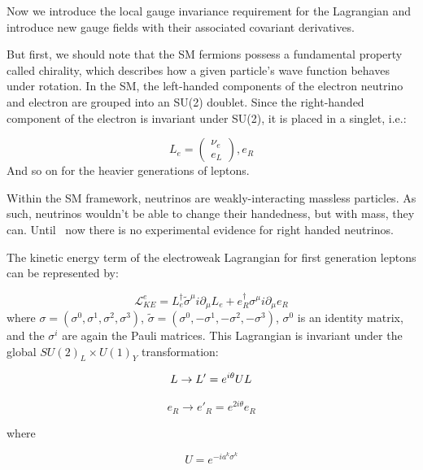 Now we introduce the local gauge invariance requirement for the Lagrangian and introduce new gauge fields with their associated covariant derivatives.

But first, we should note that the SM fermions possess a fundamental property called chirality, which describes how a given particle's wave function behaves under rotation. In the SM, the left-handed components of the electron neutrino and electron are grouped into an SU(2) doublet. Since the right-handed component of the electron is invariant under SU(2), it is placed in a singlet, i.e.:

\begin{equation}
L_{e} = \begin{pmatrix}
	\nu_{e} \\
	e_{L}
\end{pmatrix}
, e_{R}
\end{equation}
 And so on for the heavier generations of leptons. 

Within the SM framework, neutrinos are weakly-interacting massless particles. As such, neutrinos wouldn't be able to change their handedness, but with mass, they can. Until \
now there is no experimental evidence for right handed neutrinos.

 The kinetic energy term of the electroweak Lagrangian for first generation leptons can be represented by:

 \begin{equation}
 \mathcal{L}_{KE}^{e} = L_{e}^{\dagger}\tilde{\sigma}^{\mu}i\partial_{\mu}L_{e}+ e_{R}^{\dagger}\sigma^{\mu}i\partial_{\mu}e_{R}
 \end{equation}
where $\sigma = (\sigma^{0}, \sigma^{1},\sigma^{2}, \sigma^{3})$, $\tilde{\sigma} = (\sigma^{0}, -\sigma^{1},-\sigma^{2}, -\sigma^{3})$, $\sigma^{0}$ is an identity matrix, and the $\sigma^{i}$ are again the Pauli matrices. This Lagrangian is invariant under the global $SU(2)_{L}\times U(1)_{Y}$ transformation:

\begin{equation}
L\rightarrow L' = e^{i\theta}UL\\
\end{equation}

\begin{equation}
e_{R}\rightarrow e'_{R} = e^{2i\theta}e_{R}
\end{equation}

where

\begin{equation}
U = e^{-ia^{k}\sigma^{k}}
\end{equation}

